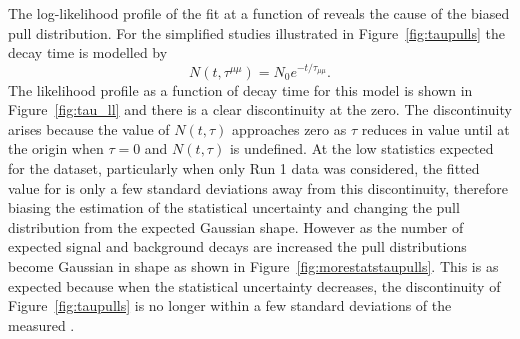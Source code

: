 {The log-likelihood profile of the  fit at a function of \tmumu reveals the cause of the biased pull distribution. For the simplified studies illustrated in Figure~\ref{fig:taupulls} the decay time is modelled by
\begin{equation}
N(t, \tau^{\mu \mu}) = N_{0}e^{-t/\tau_{\mu\mu}}.
\end{equation}
The likelihood profile as a function of decay time for this model is shown in Figure~\ref{fig:tau_ll} and there is a clear discontinuity at the zero. The discontinuity arises because the value of $N(t, \tau)$ approaches zero as $\tau$ reduces in value until at the origin when $\tau = 0$ and $N(t, \tau)$ is undefined. %
At the low statistics expected for the dataset, particularly when only Run 1 data was considered, the fitted value for \tmumu is only a few standard deviations away from this discontinuity, therefore biasing the estimation of the statistical uncertainty and changing the pull distribution from the expected Gaussian shape. However as the number of expected signal and background decays are increased the \tmumu pull distributions become Gaussian in shape as shown in Figure~\ref{fig:morestatstaupulls}. This is as expected because when the statistical uncertainty decreases, the discontinuity of Figure~\ref{fig:taupulls} is no longer within a few standard deviations of the measured \tmumu.



}

